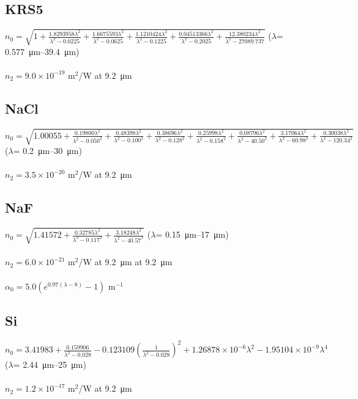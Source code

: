\subsection*{KRS5}
$n_0=\sqrt{1+\frac{1.8293958\lambda^2}{\lambda^2-0.0225}+\frac{1.6675593\lambda^2}{\lambda^2-0.0625}+\frac{1.1210424\lambda^2}{\lambda^2-0.1225}+\frac{0.04513366\lambda^2}{\lambda^2-0.2025}+\frac{12.380234\lambda^2}{\lambda^2-27089.737}}$ (\(\lambda\)= \SIrange{0.577}{39.4}{\micro\meter}) \cite{Rodney-1956}\\
\\
$n_2 = 9.0 \times 10^{-19}$ m$^2$/W at \SI{9.2}{\micro\meter} \cite{Polyanskiy-2023}

\subsection*{NaCl}
$n_0=\sqrt{1.00055+\frac{0.19800\lambda^2}{\lambda^2-0.050^2}+\frac{0.48398\lambda^2}{\lambda^2-0.100^2}+\frac{0.38696\lambda^2}{\lambda^2-0.128^2}+\frac{0.25998\lambda^2}{\lambda^2-0.158^2}+\frac{0.08796\lambda^2}{\lambda^2-40.50^2}+\frac{3.17064\lambda^2}{\lambda^2-60.98^2}+\frac{0.30038\lambda^2}{\lambda^2-120.34^2}}$ (\(\lambda\)= \SIrange{0.2}{30}{\micro\meter}) \cite{Li-1976}\\
\\
$n_2 = 3.5 \times 10^{-20}$ m$^2$/W at \SI{9.2}{\micro\meter} \cite{Polyanskiy-2021b}

\subsection*{NaF}
$n_0=\sqrt{1.41572+\frac{0.32785\lambda^2}{\lambda^2-0.117^2}+\frac{3.18248\lambda^2}{\lambda^2-40.57^2}}$ (\(\lambda\)= \SIrange{0.15}{17}{\micro\meter}) \cite{Li-1976}\\
\\
$n_2 = 6.0 \times 10^{-21}$ m$^2$/W at \SI{9.2}{\micro\meter} at \SI{9.2}{\micro\meter} \cite{Polyanskiy-2023}\\
\\
$\alpha_0 = 5.0 (e^{0.97(\lambda-8)}-1)$ m$^{-1}$ \cite{Polyanskiy-2023}

\subsection*{Si}
$n_0=3.41983+\frac{0.159906}{\lambda^2-0.028}-0.123109\left(\frac{1}{\lambda^2-0.028}\right)^2+1.26878\times 10^{-6}\lambda^2-1.95104\times 10^{-9}\lambda^4$ (\(\lambda\)= \SIrange{2.44}{25}{\micro\meter}) \cite{Edwards-1980}\\
\\
$n_2 = 1.2\times 10^{-17}$ m$^2$/W at \SI{9.2}{\micro\meter} \cite{Polyanskiy-2023}

